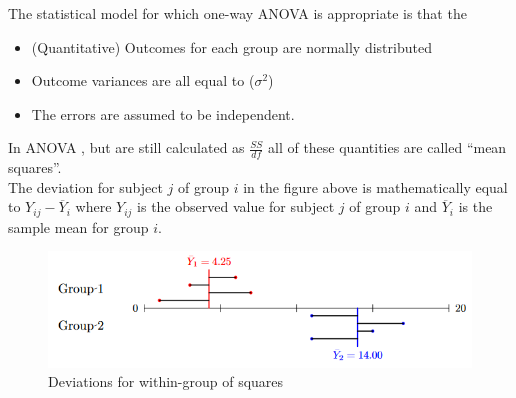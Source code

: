 \begin{center}
	The statistical model for which one-way ANOVA is appropriate is that the
	\begin{itemize}
		\item (Quantitative) Outcomes for each group are normally distributed
		\item Outcome variances are all equal to  ($\sigma^{2}$)
		\item The errors are assumed to be independent.
	\end{itemize}
\end{center}

\begin{center}
\end{center}

In ANOVA , but are still calculated as $\frac{SS}{df}$ all of these quantities are
called ``mean squares''.\\

The deviation for subject $j$ of group $i$ in the figure above is mathematically equal to $Y_{ij}-
\overline{Y}_{i}$ where $Y_{ij}$ is the observed value for subject $j$ of group $i$ and $\overline{Y}_{i}$ is the sample mean for group $i$.
\begin{figure}[H]
	\begin{center}
		\includegraphics[width=\textwidth]{./chap/1chap/2sec/3images/3_anovaInterGrp.PNG}
	\end{center}
	\caption{Deviations for within-group of squares}
	\label{fig:3_anovaInterGrp}
\end{figure}
\begin{center}
\end{center}

